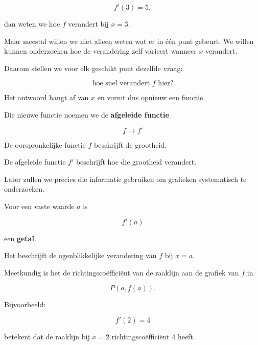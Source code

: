 \documentclass{ximera}
\begin{document}
\[
f'(3)=5,
\]

dan weten we hoe $f$ verandert bij $x=3$.

Maar meestal willen we niet alleen weten wat er in één punt gebeurt.
We willen kunnen onderzoeken hoe de verandering zelf varieert
wanneer $x$ verandert.

Daarom stellen we voor elk geschikt punt dezelfde vraag:

\[
\boxed{\text{hoe snel verandert }f\text{ hier?}}
\]

Het antwoord hangt af van $x$ en vormt dus opnieuw een functie.

Die nieuwe functie noemen we de \textbf{afgeleide functie}.

\[
\boxed{
f
\longrightarrow
f'
}
\]

De oorspronkelijke functie $f$ beschrijft de grootheid.

De afgeleide functie $f'$ beschrijft hoe die grootheid verandert.

Later zullen we precies die informatie gebruiken om grafieken
systematisch te onderzoeken.







Voor een vaste waarde $a$ is

\[
f'(a)
\]

een \textbf{getal}.

Het beschrijft de ogenblikkelijke verandering van $f$
bij $x=a$.

Meetkundig is het de richtingscoëfficiënt van de raaklijn
aan de grafiek van $f$ in

\[
P(a,f(a)).
\]

Bijvoorbeeld:

\[
f'(2)=4
\]

betekent dat de raaklijn bij $x=2$ richtingscoëfficiënt $4$ heeft.


\end{document}
